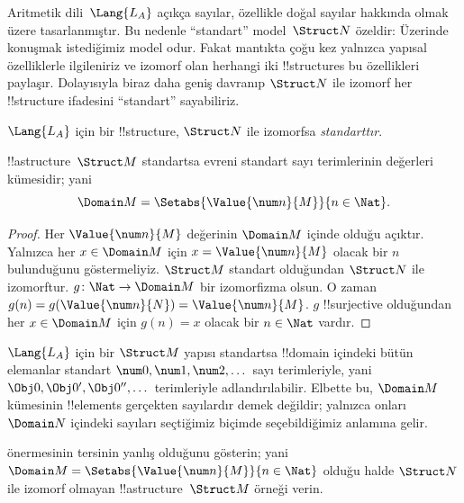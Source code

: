 \documentclass[../../../include/open-logic-section]{subfiles}
\begin{document}

Aritmetik dili~$\Lang{L_A}$ açıkça sayılar, özellikle doğal sayılar
hakkında olmak üzere tasarlanmıştır. Bu nedenle ``standart''
model~$\Struct N$ özeldir: Üzerinde konuşmak istediğimiz model odur.
Fakat mantıkta çoğu kez yalnızca yapısal özelliklerle ilgileniriz ve
izomorf olan herhangi iki !!{structure}s bu özellikleri paylaşır.
Dolayısıyla biraz daha geniş davranıp $\Struct N$ ile izomorf her
!!{structure} ifadesini ``standart'' sayabiliriz.

\begin{defn}
$\Lang{L_A}$ için bir !!{structure}, $\Struct N$ ile izomorfsa
\emph{standarttır}.
\end{defn}

\begin{prop}
 !!a{structure}~$\Struct M$ standartsa
evreni standart sayı terimlerinin değerleri kümesidir; yani
\[
\Domain M=\Setabs{\Value{\num n}{M}}{n\in\Nat}.
\]
\end{prop}

\begin{proof}
Her $\Value{\num n}{M}$ değerinin $\Domain M$ içinde olduğu açıktır.
Yalnızca her $x\in\Domain M$ için $x=\Value{\num n}{M}$ olacak bir
$n$ bulunduğunu göstermeliyiz. $\Struct M$ standart olduğundan
$\Struct N$ ile izomorftur. $g\colon\Nat\to\Domain M$ bir izomorfizma
olsun. O zaman
$g(n)=g(\Value{\num n}{N})=\Value{\num n}{M}$. $g$ !!{surjective}
olduğundan her $x\in\Domain M$ için $g(n)=x$ olacak bir $n\in\Nat$
vardır.
\end{proof}

\begin{explain}
$\Lang{L_A}$ için bir $\Struct M$ yapısı standartsa !!{domain}
içindeki bütün elemanlar standart $\num0,\num1,\num2,\dots$ sayı
terimleriyle, yani $\Obj0,\Obj0',\Obj0'',\dots$ terimleriyle
adlandırılabilir. Elbette bu, $\Domain M$ kümesinin !!{element}s
gerçekten sayılardır demek değildir; yalnızca onları $\Domain N$
içindeki sayıları seçtiğimiz biçimde seçebildiğimiz anlamına gelir.
\end{explain}

\begin{prob}
 önermesinin tersinin yanlış
olduğunu gösterin; yani
$\Domain M=\Setabs{\Value{\num n}{M}}{n\in\Nat}$ olduğu halde
$\Struct N$ ile izomorf olmayan !!a{structure}~$\Struct M$ örneği verin.
\end{prob}
\end{document}
